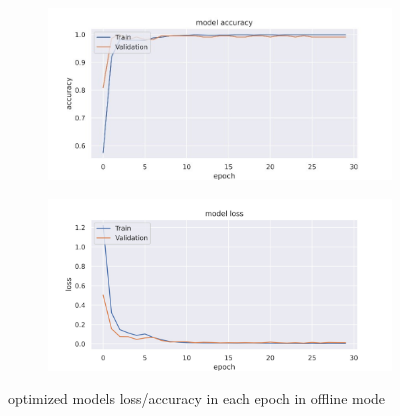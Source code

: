 \begin{figure}
    \centering
    \begin{subfigure}[b]{0.2\textwidth}
        \includegraphics[width=\textwidth]{figures/Opt_OF/acc.jpg}
    \end{subfigure}
    \begin{subfigure}[b]{0.2\textwidth}
        \includegraphics[width=\textwidth]{figures/Opt_OF/loss.jpg}
    \end{subfigure}
    
    \caption{\centering
    optimized models loss/accuracy  in each epoch in offline mode
    }
    \label{fig:org_of}
\end{figure}